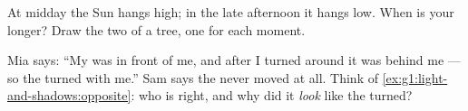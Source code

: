 \begin{exercise}[$\star$]\label{exo:g1:light-and-shadows:8}
At midday the Sun hangs high; in the late afternoon it hangs low.
When is your  longer? Draw the two  of a tree, one for
each moment.
\end{exercise}

\begin{exercise}[$\star\star$]\label{exo:g1:light-and-shadows:9}
Mia says: ``My  was in front of me, and after I turned around
it was behind me --- so the  turned with me.'' Sam says the
 never moved at all. Think of
\cref{ex:g1:light-and-shadows:opposite}: who is right, and why did it
\emph{look} like the  turned?
\end{exercise}
